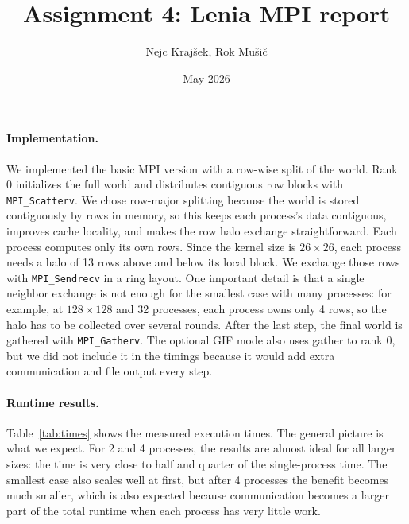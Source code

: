 \documentclass[10pt,a4paper]{article}
\title{Assignment 4: Lenia MPI report}
\author{Nejc Kraj\v{s}ek, Rok Mu\v{s}i\v{c}}
\date{May 2026}
\begin{document}
\maketitle
\vspace{-1.5em}

\paragraph{Implementation.}
We implemented the basic MPI version with a row-wise split of the world. Rank 0 initializes the full world and distributes contiguous row blocks with \texttt{MPI\_Scatterv}. We chose row-major splitting because the world is stored contiguously by rows in memory, so this keeps each process's data contiguous, improves cache locality, and makes the row halo exchange straightforward. Each process computes only its own rows. Since the kernel size is $26\times 26$, each process needs a halo of 13 rows above and below its local block. We exchange those rows with \texttt{MPI\_Sendrecv} in a ring layout. One important detail is that a single neighbor exchange is not enough for the smallest case with many processes: for example, at $128\times 128$ and 32 processes, each process owns only 4 rows, so the halo has to be collected over several rounds. After the last step, the final world is gathered with \texttt{MPI\_Gatherv}. The optional GIF mode also uses gather to rank 0, but we did not include it in the timings because it would add extra communication and file output every step.

\paragraph{Runtime results.}
Table~\ref{tab:times} shows the measured execution times. The general picture is what we expect. For 2 and 4 processes, the results are almost ideal for all larger sizes: the time is very close to half and quarter of the single-process time. The smallest case also scales well at first, but after 4 processes the benefit becomes much smaller, which is also expected because communication becomes a larger part of the total runtime when each process has very little work.
\end{document}
